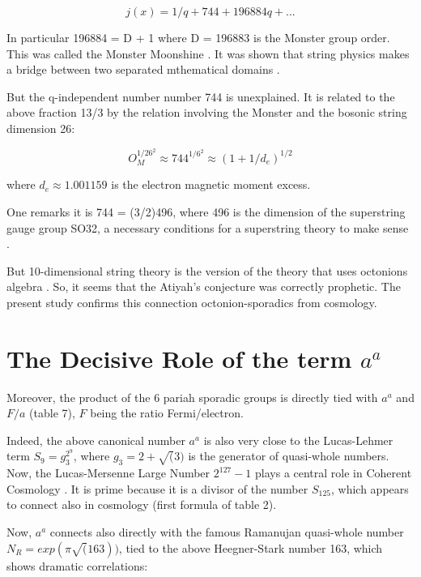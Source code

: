 \documentclass[a4paper,9pt]{article}
\begin{document}
\begin{equation}
j(x) = 1/q + 744 + 196884 q + ...
\end{equation}

In particular 196884 = D + 1 where D = 196883 is the Monster group order. This was called the Monster Moonshine \cite{Conway}. It was shown that string physics makes a bridge between two separated mthematical domains \cite{Borcherds}. 


But the q-independent number number 744 is unexplained. It is related to the above fraction 13/3 by the relation involving the Monster and the bosonic string dimension 26:

\begin{equation}
  O_M^{1/26^2} \approx 744^{1/6^2}\approx (1+1/d_e)^{1/2}   
\end{equation}

where $d_e \approx 1.001159$ is the electron magnetic moment excess.

One  remarks it is 744 = (3/2)496, where 496 is the dimension of the superstring gauge group SO32, a necessary conditions for a superstring theory to make sense \cite{Green}.


But 10-dimensional string theory is the version of the theory that uses octonions algebra \cite{Schlay}. So, it seems that the Atiyah's conjecture was correctly prophetic. The present study confirms this connection octonion-sporadics from cosmology.

\section{The Decisive Role of the term $a^a$ }

Moreover, the product of the 6 pariah sporadic groups is directly tied with $a^a$ and $F/a$ (table 7), $F$ being the ratio Fermi/electron. 

Indeed, the above canonical number $a^a$  is also very close to the Lucas-Lehmer term $S_9 = g_3^{2^9}$, where $ g_3 = 2 + \sqrt(3)$ is the generator of quasi-whole numbers. Now, the Lucas-Mersenne Large Number $2^{127} - 1$ plays a central role in Coherent Cosmology \cite{Sanchez}. It is prime because it is a divisor of the number $S_{125}$, which appears to connect also in cosmology (first formula of table 2).

Now, $a^a$ connects also directly with the famous Ramanujan quasi-whole number $N_R = exp(\pi \sqrt(163))$, tied to the above Heegner-Stark number 163, which shows dramatic correlations:
\end{document}
